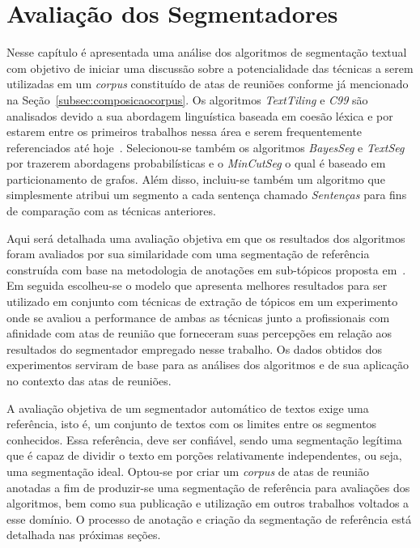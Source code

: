 \chapter{Avaliação dos Segmentadores}\label{cap-segmentadores}




Nesse capítulo é apresentada uma análise dos algoritmos de segmentação textual com objetivo de iniciar uma discussão sobre a potencialidade das técnicas a serem utilizadas em um \textit{corpus} constituído de atas de reuniões conforme já mencionado na Seção~\ref{subsec:composicaocorpus}. 
Os algoritmos \textit{TextTiling} e \textit{C99} são analisados devido a sua abordagem linguística baseada em coesão léxica e por estarem entre os primeiros trabalhos nessa área e serem frequentemente referenciados até hoje~\cite{AlemiG15}. 
%	
Selecionou-se também os algoritmos \textit{BayesSeg} e \textit{TextSeg} por trazerem abordagens probabilísticas e o \textit{MinCutSeg} o qual é baseado em particionamento de grafos.
% 
Além disso, incluiu-se também um algoritmo que simplesmente atribui um segmento a cada sentença chamado \textit{Sentenças} para fins de comparação com as técnicas anteriores.


Aqui será detalhada uma avaliação objetiva em que os resultados dos algoritmos foram avaliados por sua similaridade com uma segmentação de referência construída com base na metodologia de anotações em sub-tópicos proposta em~\cite{Hovy2010}. Em seguida escolheu-se o modelo que apresenta melhores resultados para ser utilizado em conjunto com técnicas de extração de tópicos em um experimento onde se avaliou a performance de ambas as técnicas junto a profissionais com afinidade com atas de reunião que forneceram suas percepções em relação aos resultados do segmentador empregado nesse trabalho. Os dados obtidos dos experimentos serviram de base para as análises dos algoritmos e de sua aplicação no contexto das atas de reuniões.




A avaliação objetiva de um segmentador automático de textos exige uma referência, isto é, um conjunto de textos com os limites entre os segmentos conhecidos. Essa referência, deve ser confiável, sendo uma segmentação legítima que é capaz de dividir o texto em porções relativamente independentes, ou seja, uma segmentação ideal.
Optou-se por criar um \textit{corpus} de atas de reunião anotadas a fim de produzir-se uma segmentação de referência para avaliações dos algoritmos, bem como sua publicação e utilização em outros trabalhos voltados a esse domínio. O processo de anotação e criação da segmentação de referência está detalhada nas próximas seções.





